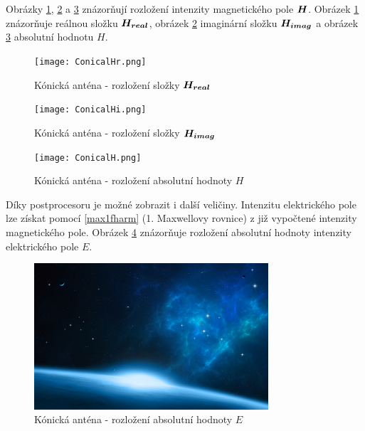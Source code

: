 \documentclass[12pt,a4paper,oneside]{article}
\numberwithin{equation}{section} %
\numberwithin{figure}{section} %
\numberwithin{table}{section} %
\renewcommand{\vec}[1]{\mbox{\boldmath$#1$}} %
\begin{document}
Obrázky \ref{Hreal}, \ref{Himag} a \ref{absH} znázorňují rozložení intenzity magnetického pole $\vec{H}$. Obrázek \ref{Hreal} znázorňuje reálnou složku $\vec{H _{real}}$, obrázek \ref{Himag} imaginární složku $\vec{H _{imag}}$ a obrázek \ref{absH} absolutní hodnotu $H$.

\begin{figure}
\begin{center}
\texttt{[image: ConicalHr.png]} 
\caption{Kónická anténa - rozložení složky $\vec{H _{real}}$} 
\label{Hreal}
\end{center}
\end{figure}

\begin{figure}
\begin{center}
\texttt{[image: ConicalHi.png]} 
\caption{Kónická anténa - rozložení složky $\vec{H _{imag}}$} 
\label{Himag}
\end{center}
\end{figure}

\begin{figure}
\begin{center}
\texttt{[image: ConicalH.png]} 
\caption{Kónická anténa - rozložení absolutní hodnoty $H$} 
\label{absH}
\end{center}
\end{figure}

Díky postprocesoru je možné zobrazit i další veličiny. Intenzitu elektrického pole lze získat pomocí \ref{max1fharm} (1. Maxwellovy rovnice) z již vypočtené intenzity magnetického pole. Obrázek \ref{absE} znázorňuje rozložení absolutní hodnoty intenzity elektrického pole $E$.

\begin{figure}
\begin{center}
\includegraphics[width=8.7cm]{58.jpg} 
\caption{Kónická anténa - rozložení absolutní hodnoty $E$} 
\label{absE}
\end{center}
\end{figure}
\end{document}

